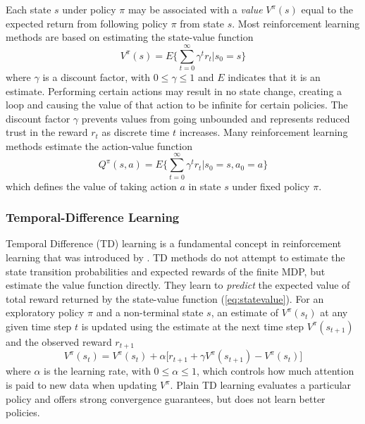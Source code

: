 Each state $s$ under policy $\pi$ may be associated with a \textit{value}
$V^\pi(s)$ equal to the expected return from following policy $\pi$ from state
$s$.  Most reinforcement learning methods are based on estimating the
state-value function
\begin{equation}
\label{eq:statevalue}
V^\pi(s) = E \Bigg\lbrace \sum^\infty_{t=0} \gamma^t r_t \Bigg\vert s_0 = s
\Bigg\rbrace
\end{equation}
where $\gamma$ is a discount factor, with $0\leq \gamma \leq 1$ and $E$
indicates that it is an estimate. Performing certain actions may result in no
state change, creating a loop and causing the value of that action to be infinite for certain policies.
The discount factor $\gamma$ prevents values from going unbounded and
represents reduced trust in the reward $r_t$ as discrete time $t$
increases.  Many reinforcement learning methods estimate the action-value
function
\begin{equation}
\label{eq:actionvalue}
Q^\pi(s,a) = E \Bigg\lbrace \sum^\infty_{t=0} \gamma^t r_t \Bigg\vert s_0 = s,
a_0 = a \Bigg\rbrace
\end{equation}
which defines the value of taking action $a$ in state $s$ under fixed policy
$\pi$.

\subsubsection{Temporal-Difference Learning}
Temporal Difference (TD) learning is a fundamental concept in reinforcement
learning that was introduced by . TD methods do not
attempt to estimate the state transition probabilities and expected rewards of
the finite MDP, but estimate the value function directly. They learn to
\textit{predict} the expected value of total reward returned by the state-value
function (\ref{eq:statevalue}).  For an exploratory policy $\pi$ and a
non-terminal state $s$, an estimate of $V^\pi(s_t)$ at any given time step $t$
is updated using the estimate at the next time step $V^\pi(s_{t+1})$ and the
observed reward $r_{t+1}$
\begin{equation}
V^\pi(s_t) = V^\pi(s_t) + \alpha \bigl[r_{t+1} + \gamma
V^\pi(s_{t+1}) - V^\pi(s_t) \bigr]
\end{equation}
where $\alpha$ is the learning rate, with $0 \leq \alpha \leq 1$, which controls
how much attention is paid to new data when updating $V^\pi$.  Plain TD
learning evaluates a particular policy and offers strong convergence
guarantees, but does not learn better policies.

